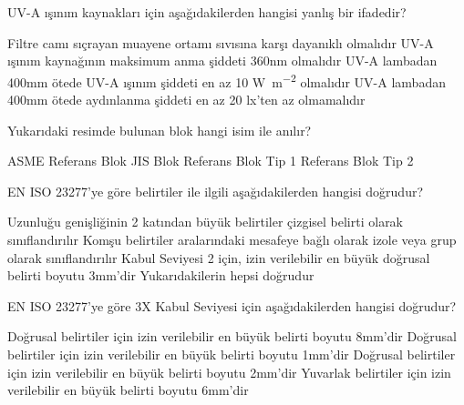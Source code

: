 \begin{question}[subtitle= EN ISO 3059]
  UV-A ışınım kaynakları için aşağıdakilerden hangisi yanlış bir ifadedir?
	\begin{tasks}
		\task Filtre camı sıçrayan muayene ortamı sıvısına karşı dayanıklı olmalıdır
		\task UV-A ışınım kaynağının maksimum anma şiddeti 360nm olmalıdır \correct
		\task UV-A lambadan 400mm ötede UV-A ışınım şiddeti en az 10 \si{\watt\per\m^{2}} olmalıdır
		\task UV-A lambadan 400mm ötede aydınlanma şiddeti en az 20 lx'ten az olmamalıdır
	\end{tasks}
\end{question}
\begin{solution}
	\correct
\end{solution}

\begin{question}[subtitle=]
    	\begin{figure}[!htb]
		\centering
		\fbox{\texttt{[image: asmeblok]}}
	\end{figure}

        Yukarıdaki resimde bulunan blok hangi isim ile anılır?
	\begin{tasks}
          \task ASME Referans Blok \correct
          \task JIS Blok
          \task Referans Blok Tip 1
          \task Referans Blok Tip 2
	\end{tasks}
\end{question}
\begin{solution}
	\correct
\end{solution}

\begin{question}[subtitle= EN ISO 23277]
  EN ISO 23277'ye göre belirtiler ile ilgili aşağıdakilerden hangisi doğrudur?
	\begin{tasks}
		\task Uzunluğu genişliğinin 2 katından büyük belirtiler çizgisel belirti olarak sınıflandırılır
		\task Komşu belirtiler aralarındaki mesafeye bağlı olarak izole veya grup olarak sınıflandırılır \correct
		\task Kabul Seviyesi 2 için, izin verilebilir en büyük doğrusal belirti boyutu 3mm'dir 
		\task Yukarıdakilerin hepsi doğrudur
	\end{tasks}
\end{question}
\begin{solution}
	\correct
\end{solution}

\begin{question}[subtitle= EN ISO 23277]
  EN ISO 23277'ye göre 3X Kabul Seviyesi için aşağıdakilerden hangisi doğrudur?
	\begin{tasks}
		\task Doğrusal belirtiler için izin verilebilir en büyük belirti boyutu 8mm'dir
		\task Doğrusal belirtiler için izin verilebilir en büyük belirti boyutu 1mm'dir
		\task Doğrusal belirtiler için izin verilebilir en büyük belirti boyutu 2mm'dir  \correct
		\task Yuvarlak belirtiler için izin verilebilir en büyük belirti boyutu 6mm'dir
	\end{tasks}
\end{question}
\begin{solution}
	\correct
\end{solution}

